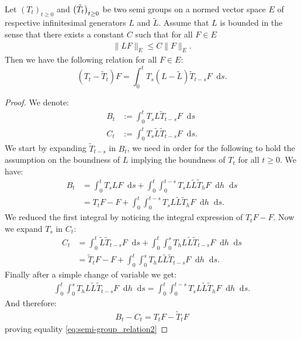 \documentclass[11pt,a4paper]{article}
\newcommand{\Proc}[1]{\left(#1\right)_{t\geq 0}}
\newcommand{\dd}{\mathop{}\!\mathrm{d}}
\begin{document}
Let $\Proc{T_t}$ and $\Proc{\Tilde{T}_t}$ be two semi groups on a normed vector space $E$ of respective infinitesimal generators $L$ and $\tilde{L}$. Assume that $L$ is bounded in the sense that there exists a constant $C$ such that for all $F \in E$ 
\begin{align*}
    \| L F\|_E \leq C \|F\|_E.
\end{align*}
Then we have the following relation for all $F \in E$:
\begin{equation}\label{eq:semi-group_relation2}
    \left(T_t - \tilde{T}_t\right)F = \int_0^t T_s \left( L - \tilde{L} \right) \tilde{T}_{t-s}F \dd s.
\end{equation}
\begin{proof}
    We denote:
    \begin{align*}
        B_t &:= \int_0^t T_s L \tilde{T}_{t-s}F \dd s\\
        C_t &:= \int_0^t T_s \tilde{L} \tilde{T}_{t-s}F \dd s.
    \end{align*}
    We start by expanding $\tilde{T}_{t-s}$ in $B_t$, we need in order for the following to hold the assumption on the boundness of $L$ implying the boundness of $T_t$ for all $t\geq 0$. We have:
    \begin{align*}
        B_t &= \int_0^t T_s LF \dd s + \int_0^t\int_0^{t-s} T_s L \tilde{L} \tilde{T}_h F \dd h \dd s\\
        &= T_tF - F +  \int_0^t\int_0^{t-s} T_s L \tilde{L} \tilde{T}_h F \dd h \dd s.
     \end{align*}
     We reduced the first integral by noticing the integral expression of $T_tF - F$. Now we expand $T_s$ in $C_t$:
     \begin{align*}
        C_t &= \int_0^t \tilde{L} \tilde{T}_{t-s}F \dd s +
        \int_0^t \int_0^s T_h L\tilde{L} \tilde{T}_{t-s}F \dd h \dd s\\
        &= \tilde{T}_t F - F + \int_0^t \int_0^s T_h L\tilde{L} \tilde{T}_{t-s}F \dd h \dd s.
     \end{align*}
     Finally after a simple change of variable we get:
     \begin{align*}
         \int_0^t \int_0^s T_h L\tilde{L} \tilde{T}_{t-s}F \dd h \dd s = \int_0^t\int_0^{t-s} T_s L \tilde{L} \tilde{T}_h F \dd h \dd s.
     \end{align*}
     And therefore:
     \begin{align*}
         B_t - C_t = T_t F - \tilde{T}_t F
     \end{align*}
     proving equality \eqref{eq:semi-group_relation2}
\end{proof}
\end{document}
